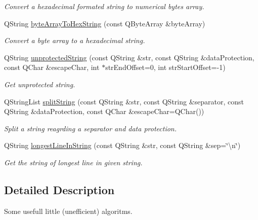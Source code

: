 \begin{DoxyCompactItemize}
\begin{DoxyCompactList}\small\item\em Convert a hexadecimal formated string to numerical bytes array. \end{DoxyCompactList}\item 
Q\-String \hyperlink{namespacemdt_algorithms_a29977b36180db7518a7ee2317265d26b}{byte\-Array\-To\-Hex\-String} (const Q\-Byte\-Array \&byte\-Array)
\begin{DoxyCompactList}\small\item\em Convert a byte array to a hexadecimal string. \end{DoxyCompactList}\item 
Q\-String \hyperlink{namespacemdt_algorithms_a4f1b12dbe1f3c93dc5138f144d84de93}{unprotected\-String} (const Q\-String \&str, const Q\-String \&data\-Protection, const Q\-Char \&escape\-Char, int $\ast$str\-End\-Offset=0, int str\-Start\-Offset=-\/1)
\begin{DoxyCompactList}\small\item\em Get unprotected string. \end{DoxyCompactList}\item 
Q\-String\-List \hyperlink{namespacemdt_algorithms_a28d7d5eb9578936c950039fa2f86a1bf}{split\-String} (const Q\-String \&str, const Q\-String \&separator, const Q\-String \&data\-Protection, const Q\-Char \&escape\-Char=Q\-Char())
\begin{DoxyCompactList}\small\item\em Split a string reagrding a separator and data protection. \end{DoxyCompactList}\item 
Q\-String \hyperlink{namespacemdt_algorithms_a677bc997e04f77c1be0f5ce0fdb56e67}{longest\-Line\-In\-String} (const Q\-String \&str, const Q\-String \&sep=\char`\"{}\textbackslash{}n\char`\"{})
\begin{DoxyCompactList}\small\item\em Get the string of longest line in given string. \end{DoxyCompactList}\end{DoxyCompactItemize}


\subsection{Detailed Description}
Some usefull little (unefficient) algoritms. 

